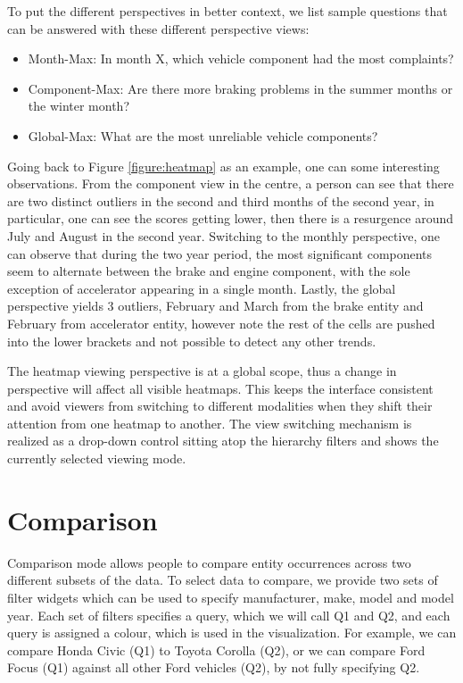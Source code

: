 To put the different perspectives in better context, we list sample 
questions that can be answered with these different perspective views:
\begin{itemize} [noitemsep]
  \item Month-Max: In month X, which vehicle component had the most complaints?
  \item Component-Max: Are there more braking problems in the summer months or
  the winter month?
  \item Global-Max: What are the most unreliable vehicle components?
\end{itemize}

Going back to Figure \ref{figure:heatmap} as an example, one can some
interesting observations. From the component view in the centre, a person can
see that there are two distinct outliers in the second and third months of the
second year, in particular, one can see the scores getting lower, then there is
a resurgence around July and August in the second year. Switching to the monthly
perspective, one can observe that during the two year period, the most
significant components seem to alternate between the brake and engine component,
with the sole exception of accelerator appearing in a single month. Lastly, the
global perspective yields 3 outliers, February and March from the brake entity
and February from accelerator entity, however note the rest of the cells are
pushed into the lower brackets and not possible to detect any other trends.
 
The heatmap viewing perspective is at a global scope, thus a change in
perspective will affect all visible heatmaps. This keeps the interface
consistent and avoid viewers from switching to different modalities when they
shift their attention from one heatmap to another. The view switching mechanism
is realized as a drop-down control sitting atop the hierarchy filters and shows
the currently selected viewing mode.



\section{Comparison}
Comparison mode allows people to compare entity occurrences across
two different subsets of the data. To select data to compare, we provide
two sets of filter widgets which can be used to specify manufacturer,
make, model and model year. Each set of filters specifies a query,
which we will call Q1 and Q2, and each query is assigned a colour,
which is used in the visualization. For example, we can compare
Honda Civic (Q1) to Toyota Corolla (Q2), or we can compare Ford
Focus (Q1) against all other Ford vehicles (Q2), by not fully specifying Q2.

